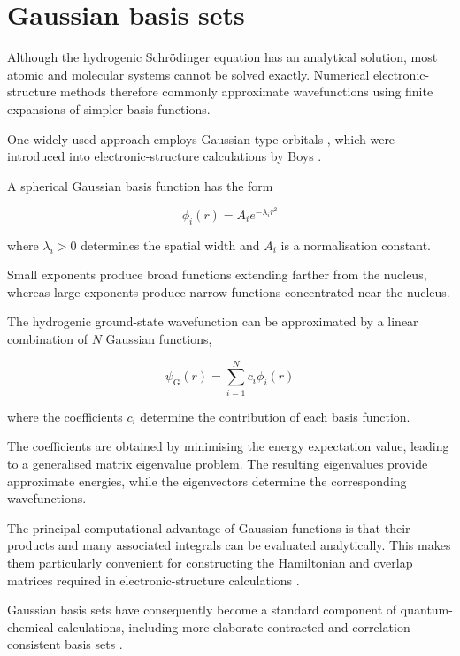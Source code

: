 \section{Gaussian basis sets}

Although the hydrogenic Schrödinger equation has an
analytical solution, most atomic and molecular systems
cannot be solved exactly. Numerical electronic-structure
methods therefore commonly approximate wavefunctions
using finite expansions of simpler basis functions.

One widely used approach employs Gaussian-type orbitals
, which were introduced into electronic-structure
calculations by Boys \cite{Boys1950}.

A spherical Gaussian basis function has the form

\begin{equation}
    \phi_i(r)=A_i e^{-\lambda_i r^2}
    \label{eq:intro_gaussian}
\end{equation}

where \(\lambda_i>0\) determines the spatial width
and \(A_i\) is a normalisation constant.

Small exponents produce broad functions extending
farther from the nucleus, whereas large exponents
produce narrow functions concentrated near the nucleus.

The hydrogenic ground-state wavefunction can be
approximated by a linear combination of \(N\)
Gaussian functions,

\begin{equation}
    \psi_{\mathrm G}(r)
    =\sum_{i=1}^{N}c_i\phi_i(r)
    \label{eq:intro_expansion}
\end{equation}

where the coefficients \(c_i\) determine the
contribution of each basis function.

The coefficients are obtained by minimising the
energy expectation value, leading to a generalised
matrix eigenvalue problem. The resulting eigenvalues
provide approximate energies, while the eigenvectors
determine the corresponding wavefunctions.

The principal computational advantage of Gaussian
functions is that their products and many associated
integrals can be evaluated analytically. This makes
them particularly convenient for constructing the
Hamiltonian and overlap matrices required in
electronic-structure calculations \cite{Boys1950}.

Gaussian basis sets have consequently become a
standard component of quantum-chemical calculations,
including more elaborate contracted and correlation-
consistent basis sets \cite{Dunning1989,Raffenetti}.


